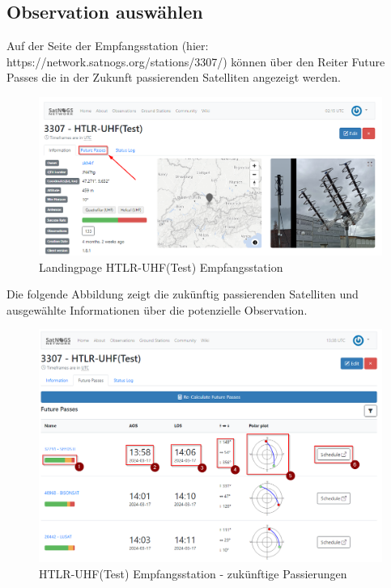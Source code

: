 \subsection{Observation auswählen}
Auf der Seite der Empfangsstation (hier: https://network.satnogs.org/stations/3307/) können über den Reiter \glqq Future Passes\grqq{}  die in der Zukunft passierenden Satelliten angezeigt werden.

\begin{figure} [H]
	\centering
	\includegraphics[width=\linewidth]{../ref/schedule_observation_futurepass.png}
	\caption{Landingpage HTLR-UHF(Test) Empfangsstation \cite{noauthor_satnogs_nodate}}
	\label{fig:htrl-uhf(test)landingpage}
\end{figure}

Die folgende Abbildung zeigt die zukünftig passierenden Satelliten und ausgewählte Informationen über die potenzielle Observation.

\begin{figure} [H]
	\centering
	\includegraphics[width=\linewidth]{../ref/schedule_observation_infos.png}
	\caption{HTLR-UHF(Test) Empfangsstation - zukünftige Passierungen \cite{noauthor_satnogs_nodate}}
	\label{fig:htrl-uhf(test)futurepasses}
\end{figure}

